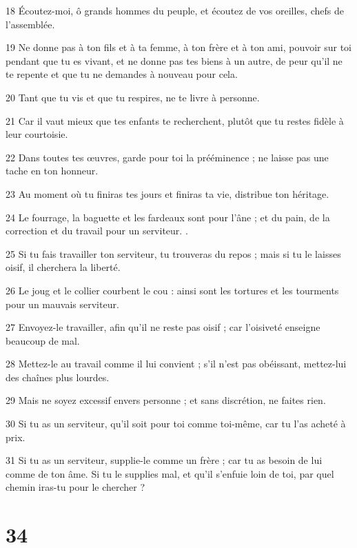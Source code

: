 \par 18 Écoutez-moi, ô grands hommes du peuple, et écoutez de vos oreilles, chefs de l'assemblée.
\par 19 Ne donne pas à ton fils et à ta femme, à ton frère et à ton ami, pouvoir sur toi pendant que tu es vivant, et ne donne pas tes biens à un autre, de peur qu'il ne te repente et que tu ne demandes à nouveau pour cela.
\par 20 Tant que tu vis et que tu respires, ne te livre à personne.
\par 21 Car il vaut mieux que tes enfants te recherchent, plutôt que tu restes fidèle à leur courtoisie.
\par 22 Dans toutes tes œuvres, garde pour toi la prééminence ; ne laisse pas une tache en ton honneur.
\par 23 Au moment où tu finiras tes jours et finiras ta vie, distribue ton héritage.
\par 24 Le fourrage, la baguette et les fardeaux sont pour l'âne ; et du pain, de la correction et du travail pour un serviteur. .
\par 25 Si tu fais travailler ton serviteur, tu trouveras du repos ; mais si tu le laisses oisif, il cherchera la liberté.
\par 26 Le joug et le collier courbent le cou : ainsi sont les tortures et les tourments pour un mauvais serviteur.
\par 27 Envoyez-le travailler, afin qu'il ne reste pas oisif ; car l'oisiveté enseigne beaucoup de mal.
\par 28 Mettez-le au travail comme il lui convient ; s'il n'est pas obéissant, mettez-lui des chaînes plus lourdes.
\par 29 Mais ne soyez excessif envers personne ; et sans discrétion, ne faites rien.
\par 30 Si tu as un serviteur, qu'il soit pour toi comme toi-même, car tu l'as acheté à prix.
\par 31 Si tu as un serviteur, supplie-le comme un frère ; car tu as besoin de lui comme de ton âme. Si tu le supplies mal, et qu'il s'enfuie loin de toi, par quel chemin iras-tu pour le chercher ?

\chapter{34}

